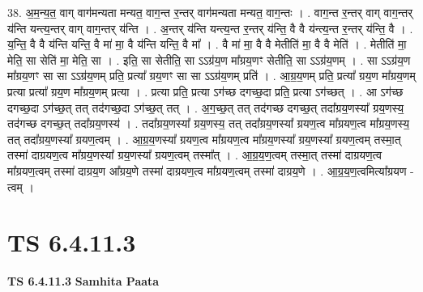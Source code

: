 \documentclass[17pt]{extarticle}
\begin{document}
38. अ॒म॒न्य॒त॒ वाग् वाग॑मन्यता मन्यत॒ वाग॒न्त र॒न्तर् वाग॑मन्यता मन्यत॒ वाग॒न्तः । . वाग॒न्त र॒न्तर् वाग् वाग॒न्तर् य॑न्ति यन्त्य॒न्तर् वाग् वाग॒न्तर् य॑न्ति । . अ॒न्तर् य॑न्ति यन्त्य॒न्त र॒न्तर् य॑न्ति॒ वै वै य॑न्त्य॒न्त र॒न्तर् य॑न्ति॒ वै । . य॒न्ति॒ वै वै य॑न्ति यन्ति॒ वै मा॑ मा॒ वै य॑न्ति यन्ति॒ वै मा᳚ । . वै मा॑ मा॒ वै वै मेतीति॑ मा॒ वै वै मेति॑ । . मेतीति॑ मा॒ मेति॒ सा सेति॑ मा॒ मेति॒ सा । . इति॒ सा सेतीति॒ सा ऽऽग्र॑य॒ण मा᳚ग्रय॒णꣳ सेतीति॒ सा ऽऽग्र॑य॒णम् । . सा ऽऽग्र॑य॒ण मा᳚ग्रय॒णꣳ सा सा ऽऽग्र॑य॒णम् प्रति॒ प्रत्या᳚ ग्रय॒णꣳ सा सा ऽऽग्र॑य॒णम् प्रति॑ । . आ॒ग्र॒य॒णम् प्रति॒ प्रत्या᳚ ग्रय॒ण मा᳚ग्रय॒णम् प्रत्या प्रत्या᳚ ग्रय॒ण मा᳚ग्रय॒णम् प्रत्या । . प्रत्या प्रति॒ प्रत्या ऽग॑च्छ दगच्छ॒दा प्रति॒ प्रत्या ऽग॑च्छत् । . आ ऽग॑च्छ दगच्छ॒दा ऽग॑च्छ॒त् तत् तद॑गच्छ॒दा ऽग॑च्छ॒त् तत् । . अ॒ग॒च्छ॒त् तत् तद॑गच्छ दगच्छ॒त् तदा᳚ग्रय॒णस्या᳚ ग्रय॒णस्य॒ तद॑गच्छ दगच्छ॒त् तदा᳚ग्रय॒णस्य॑ । . तदा᳚ग्रय॒णस्या᳚ ग्रय॒णस्य॒ तत् तदा᳚ग्रय॒णस्या᳚ ग्रयण॒त्व मा᳚ग्रयण॒त्व मा᳚ग्रय॒णस्य॒ तत् तदा᳚ग्रय॒णस्या᳚ ग्रयण॒त्वम् । . आ॒ग्र॒य॒णस्या᳚ ग्रयण॒त्व मा᳚ग्रयण॒त्व मा᳚ग्रय॒णस्या᳚ ग्रय॒णस्या᳚ ग्रयण॒त्वम् तस्मा॒त् तस्मा॑ दाग्रयण॒त्व मा᳚ग्रय॒णस्या᳚ ग्रय॒णस्या᳚ ग्रयण॒त्वम् तस्मा᳚त् । . आ॒ग्र॒य॒ण॒त्वम् तस्मा॒त् तस्मा॑ दाग्रयण॒त्व मा᳚ग्रयण॒त्वम् तस्मा॑ दाग्रय॒ण आ᳚ग्रय॒णे तस्मा॑ दाग्रयण॒त्व मा᳚ग्रयण॒त्वम् तस्मा॑ दाग्रय॒णे । . आ॒ग्र॒य॒ण॒त्वमित्या᳚ग्रयण - त्वम् । \newline
\pagebreak
{}

\section{ TS 6.4.11.3 }

\textbf{TS 6.4.11.3 } \newline
\textbf{Samhita Paata} \newline
\end{document}
